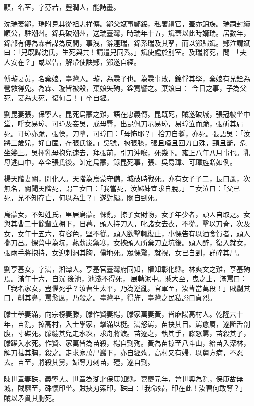 \begin{pinyinscope}
顧，名荃，字芬若，豐潤人，能詩畫。

沈瑞妻鄭，瑞附見其從祖志祥傳。鄭父斌事鄭錦，私署禮官，蓋亦錦族。瑞嗣封續順公，駐潮州。錦兵破潮州，送瑞臺灣，時瑞年十五，斌蓋以此時婿瑞。居數年，錦部有傅為霖者謀為反間，事洩，辭連瑞，錦系瑞及其孥，而以鄭歸斌。鄭泣謂斌曰：「兒既歸沈氏，生死與共！請遣兒同系。」斌使處於別室。及瑞將死，問：「夫人安在？」或以告，解帶使訣鄭，鄭遂自經。

傅璇妻黃，名棄娘，臺灣人。璇，為霖子也。為霖事敗，錦俘其孥，棄娘有兄銓為營救得免。為霖、璇皆被殺，棄娘矢殉，銓寬譬之。棄娘曰：「今日之事，子為父死，妻為夫死，復何言！」卒自經。

劉昆妻張，保寧人。昆死烏蒙之難，語在忠義傳。昆既死，賊遂破城，張冠帔坐中堂，呼女易璋、可璋及妾吳，戒毋辱，出昆佩刀示易璋，易璋泣而跪，張斫其肩死。可璋亦跪，張慄，刀墮，可璋曰：「母怖耶？」拾刀自鏨，亦死。張語吳：「汝將三歲兒，好自匿，存張氏後。」吳號，抱張膝，張且嘆且回刀自殊，頸且斷，危坐幾上。吳揮乳母抱兒速去，拜張前，引刀沖喉，死幾下。雍正八年八月事也。乳母逃山中，卒全張氏後。師定烏蒙，錄昆死事，張、吳易璋、可璋旌贈如例。

楊天階妻關，開化人。天階為烏蒙守備，城破時戰死。亦有女子子二，長曰鳳，次無名，關聞天階死，謂二女曰：「我當死，汝姊妹宜求自脫。」二女泣曰：「父已死，兄不知存亡，何以為生？」遂對縊。關自剄死。

烏蒙女，不知姓氏，里居烏蒙。惈亂，掠子女財物，女子年少者，頭人自取之。女與其曹二十餘輩立棚下，日暮，頭人持刀入，叱諸女去衣，不從。擊以刀脊，次及女，女年十五六，有容色，堅不從。頭人欲擊輒復止，小惈告有以酒食賀者，頭人擲刀出。惈營中為坑，爇薪炭禦寒，女挾頭人所棄刀立坑後。頭人醉，復入就女，張兩手將抱持，女迎刺洞其胸，僕地死。眾惈驚，就視，女已自剄，群碎其尸。

劉亨基女，字滿，湘潭人。亨基官臺灣府同知，權知彰化縣。林爽文之難，亨基殉焉。滿年十六，自沉後池，池淺不得死，展轉泥中。賊大至，曳之上，滿罵曰：「我名家女，豈懼死乎？汝曹生太平，乃為逆亂，官軍至，汝曹當萬段！」賊劙其口，劓其鼻，罵愈厲，乃殺之。臺灣平，得旌，臺灣之民私謚曰貞烈。

滕士學妻滿，向宗榜妻滕，滕作賢妻楊，滕家萬妻黃，皆麻陽高村人。乾隆六十年，苗亂，掠高村，入士學家，擊滿以梃。滿怒罵，苗抉其目。罵愈厲，遂斷舌剖腹，寸磔死。滕繃其兒走水次，求舟將渡。苗逐之，執其手，滕怒罵，苗殺其子，滕躍入水死。作賢、家萬皆為苗殺，楊自剄殉。黃為苗掠至八斗山，紿苗入深林，解刀揕其胸，殺之。走求家萬尸巖下，亦自經殉。高村又有婦，以舅方病，不忍去。苗至，將殺其舅，婦奪刀刺苗，殪，遂自剄。

陳世章妻硃，義寧人。世章為湖北保康知縣。嘉慶元年，曾世興為亂，保康故無城，賊驟至，硃懷印坐。賊挾刃索印，硃曰：「我命婦，印在此！汝曹何敢奪？」賊以矛貫其胸死。


\end{pinyinscope}
